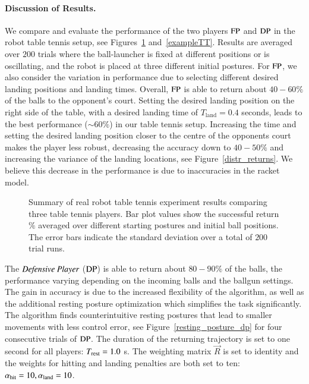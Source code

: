 \paragraph{\textbf{Discussion of Results}.} We compare and evaluate the performance of the two players $\mathrm{FP}$ and $\mathrm{DP}$ in the robot table tennis setup, see Figures~\ref{compare-players-real} and~\ref{exampleTT}. Results are averaged over $200$ trials where the ball-launcher is fixed at different positions or is oscillating, and the robot is placed at three different initial postures. For $\mathrm{FP}$, we also consider the variation in performance due to selecting different desired landing positions and landing times. Overall, $\mathrm{FP}$ is able to return about $40-60 \%$ of the balls to the opponent's court. Setting the desired landing position on the right side of the table, with a desired landing time of $T_{\textrm{land}} = 0.4$ seconds, leads to the best performance ($\sim 60\%$) in our table tennis setup. Increasing the time and setting the desired landing position closer to the centre of the opponents court makes the player less robust, decreasing the accuracy down to $40-50\%$ and increasing the variance of the landing locations, see Figure~\ref{distr_returns}. We believe this decrease in the performance is due to inaccuracies in the racket model.
%
% 
\begin{figure}
	\centering
	\setlength\figureheight{4cm}
	\setlength\figurewidth{5cm}
	
	\caption{Summary of real robot table tennis experiment results comparing three table tennis players. Bar plot values show the successful return $\%$ averaged over different starting postures and initial ball positions. The error bars indicate the standard deviation over a total of $200$ trial runs.}
	\label{compare-players-real}
\end{figure}
%

The $\emph{Defensive Player}$ ($\mathrm{DP}$) is able to return about $80-90 \%$ of the balls, the performance varying depending on the incoming balls and the ballgun settings. The gain in accuracy is due to the increased flexibility of the algorithm, as well as the additional resting posture optimization which simplifies the task significantly. The algorithm finds counterintuitive resting postures that lead to smaller movements with less control error, see Figure~\ref{resting_posture_dp} for four consecutive trials of $\mathrm{DP}$. The duration of the returning trajectory is set to one second for all players: $T_{\mathrm{rest}} = 1.0$ s. The weighting matrix $\vec{R}$ is set to identity and the weights for hitting and landing penalties are both set to ten: $\alpha_{\mathrm{hit}} = 10, \alpha_{\mathrm{land}} = 10$.
%

